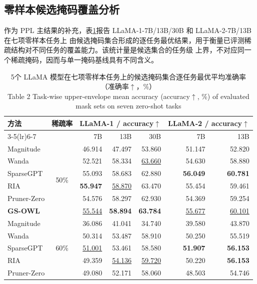 \documentclass[UTF8,fontset=fandol]{ctexart}
\renewcommand{\arraystretch}{1.08}
\newcommand{\best}[1]{\textbf{#1}}
\newcommand{\second}[1]{\underline{#1}}
\begin{document}
\FloatBarrier
\subsection{零样本候选掩码覆盖分析}

作为 PPL 主结果的补充，表\ref{tab:zero}报告 LLaMA-1-7B/13B/30B 和 LLaMA-2-7B/13B 在七项零样本任务上
由候选掩码集合形成的逐任务最优结果，用于衡量已评测稀疏结构对不同任务的覆盖能力。该统计量是候选集合的任务级
上界，不对应同一个稀疏掩码，因而与单一掩码基线具有不同含义。

\begin{table}[!htbp]
\centering
\caption{5个 LLaMA 模型在七项零样本任务上的候选掩码集合逐任务最优平均准确率（准确率$\uparrow$，\%）\\
Table 2 Task-wise upper-envelope mean accuracy (accuracy$\uparrow$, \%) of evaluated mask sets on seven zero-shot tasks}
\label{tab:zero}
\scriptsize
\setlength{\tabcolsep}{4.2pt}
\renewcommand{\arraystretch}{0.96}
\begin{tabular*}{0.98\textwidth}{@{\extracolsep{\fill}}lcrrrrr@{}}
\toprule
\multirow{2}{*}{方法} & \multirow{2}{*}{稀疏率} &
\multicolumn{3}{c}{LLaMA-1 / accuracy$\uparrow$} & \multicolumn{2}{c}{LLaMA-2 / accuracy$\uparrow$} \\
\cmidrule(lr){3-5}\cmidrule(lr){6-7}
 & & 7B & 13B & 30B & 7B & 13B \\
\midrule
Magnitude & \multirow{6}{*}{50\%} & 46.914 & 47.497 & 53.860 & 51.147 & 52.820 \\
Wanda & & 52.521 & 58.334 & \second{63.660} & 54.630 & 58.880 \\
SparseGPT & & 55.093 & 58.683 & 62.880 & \best{56.049} & \best{60.781} \\
RIA & & \best{55.947} & \second{58.870} & 63.470 & 55.454 & 59.461 \\
Pruner-Zero & & 54.576 & 58.297 & 62.930 & 54.369 & 59.254 \\
  \textbf{GS-OWL} & & \second{55.544} & \best{58.894} & \best{63.784} & \second{55.677} & \second{60.101} \\
\midrule
Magnitude & \multirow{6}{*}{60\%} & 36.086 & 41.041 & 34.740 & 39.580 & 43.870 \\
Wanda & & 50.314 & 53.487 & 58.910 & 50.250 & 55.519 \\
  SparseGPT & & \second{51.001} & 53.461 & 58.580 & \best{51.907} & \best{56.153} \\
RIA & & 49.359 & \second{54.136} & \second{59.720} & 50.220 & \best{56.153} \\
Pruner-Zero & & 49.080 & 52.171 & 58.060 & 48.503 & 54.746 \\

\end{tabular*}
\end{table}
\end{document}
